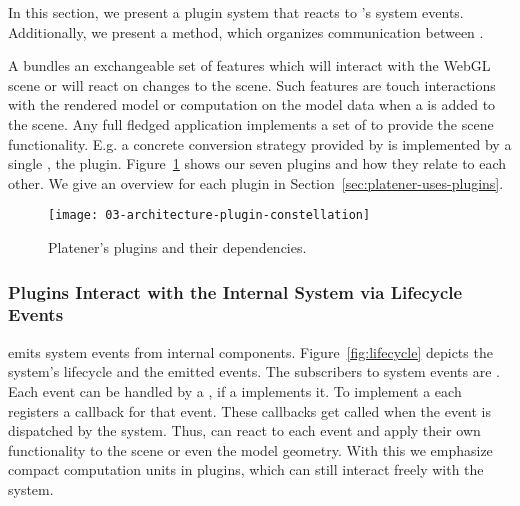 \documentclass[../../ClassicThesis.tex]{subfiles}
\begin{document}
In this section, we present a plugin system that reacts to
{\convertify}'s system events. Additionally, we present a
method, which organizes communication between
.


A  bundles an exchangeable set of features which will
interact with the WebGL scene or will react on changes to the scene.
Such features are touch interactions with the rendered model or
computation on the model data when a  is added to the
scene. Any full fledged application implements a set of
 to provide the scene functionality. E.g. a concrete
conversion strategy provided by {\platener} is implemented by a single
, the  plugin.
Figure~\ref{fig:plugin-constellation} shows our seven plugins and how
they relate to each other. We give an overview for each plugin in
Section~\ref{sec:platener-uses-plugins}.

\begin{figure}[h]
  \centering
  \texttt{[image: 03-architecture-plugin-constellation]}
  \caption{Platener's plugins and their dependencies.}
  \label{fig:plugin-constellation}
\end{figure}

\subsubsection{Plugins Interact with the Internal System via
  Lifecycle Events}


{\convertify} emits system events from internal components.
Figure~\ref{fig:lifecycle} depicts the system's lifecycle
and the emitted events. The subscribers to system events are
. Each event can be handled by a
, if a  implements it. To
implement a  each  registers
a callback for that event. These callbacks get called when
the event is dispatched by the system. Thus, 
can react to each event and apply their own functionality to
the scene or even the model geometry. With this we emphasize
compact computation units in plugins, which can still
interact freely with the system.
\end{document}
